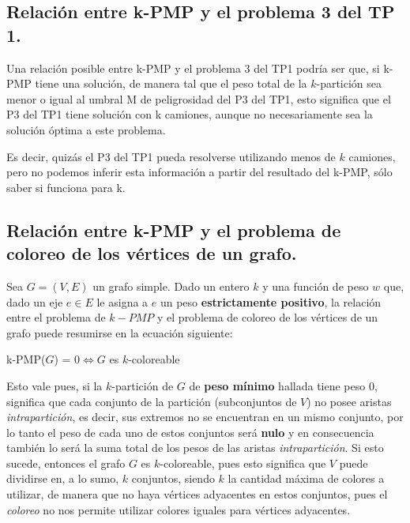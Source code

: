 \subsection{Relación entre k-PMP y el problema 3 del TP 1.}
\vspace*{0.3cm}

Una relación posible entre k-PMP y el problema 3 del TP1 podría ser que, si
k-PMP tiene una solución, de manera tal que el peso total de la $k$-partición sea menor o igual al umbral M de peligrosidad del P3 del TP1, esto significa que el P3 del TP1 tiene solución con k camiones, aunque no necesariamente sea la solución óptima a este problema.

Es decir, quizás el P3 del TP1 pueda resolverse utilizando menos de $k$ camiones, pero no podemos inferir esta información a partir del resultado del
k-PMP, sólo saber si funciona para k.


\newpage
\subsection{Relación entre k-PMP y el problema de coloreo de los vértices de
            un grafo.}
\vspace*{0.3cm}

Sea $G = (V, E)$ un grafo simple. Dado un entero $k$ y una función de peso $w$
que, dado un eje $e \in E$ le asigna a $e$ un peso \textbf{estrictamente positivo},
la relación entre el problema de $k-PMP$ y el problema de coloreo de los vértices
de un grafo puede resumirse en la ecuación siguiente:

\begin{center}
  k-PMP($G$) = $0 \iff G$ es $k$-coloreable
\end{center}

Esto vale pues, si la $k$-partición de $G$ de \textbf{peso mínimo} hallada
tiene peso $0$, significa que cada conjunto de la partición (subconjuntos de $V$)
no posee aristas \textit{intrapartición}, es decir, sus extremos no se encuentran en
un mismo conjunto, por lo tanto el peso de cada uno de estos conjuntos será
\textbf{nulo} y en consecuencia también lo será la suma total de los pesos de
las aristas \textit{intrapartición}. Si esto sucede, entonces el grafo $G$ es
$k$-coloreable, pues esto significa que $V$ puede dividirse en, a lo sumo, $k$
conjuntos, siendo $k$ la cantidad máxima de colores a utilizar, de manera que no
haya vértices adyacentes en estos conjuntos, pues el \textit{coloreo} no nos permite
utilizar colores iguales para vértices adyacentes.

